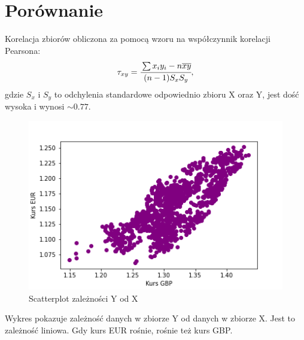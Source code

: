 \documentclass[12pt]{mwart}
\begin{document}
	\section{Porównanie}
	\noindent Korelacja zbiorów obliczona za pomocą wzoru na współczynnik korelacji Pearsona:
	\begin{equation}
		\tau_{xy} = \cfrac{\sum x_iy_i - n\overline{x}\overline{y}}{(n-1)S_xS_y}, 
	\end{equation} 
\noindent gdzie $S_x$ i $S_y$ to odchylenia standardowe odpowiednio zbioru X oraz Y, jest dość wysoka i wynosi $\sim 0.77$. 
	\begin{figure}[H]
		\centering
		\includegraphics[scale=0.7]{XY_sc.PNG}
		\caption{Scatterplot zależności Y od X}
	\end{figure}
	\noindent Wykres pokazuje zależność danych w zbiorze Y od danych w zbiorze X. Jest to zależność liniowa. Gdy kurs EUR rośnie, rośnie też kurs GBP.
\end{document}
